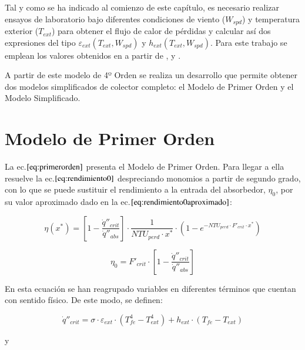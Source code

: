 Tal y como se ha indicado al comienzo de este capítulo, es necesario realizar ensayos de laboratorio bajo diferentes condiciones de viento (\(W_{spd}\)) y temperatura exterior (\(T_{ext}\)) para obtener el flujo de calor de pérdidas y calcular así dos expresiones del tipo \(\varepsilon_{ext}(T_{ext},W_{spd})\) y \(h_{ext}(T_{ext},W_{spd})\). Para este trabajo se emplean los valores obtenidos en \cite{barberofresnoDesarrolloModeloTeorico2018} a partir de \cite{burkholderHeatLossTesting2009}, \cite{burkholderHeatLossTestingSolel2008} y \cite{kutscherGenerationParabolicTrough2012}.

A partir de este modelo de 4º Orden se realiza un desarrollo que permite obtener dos modelos simplificados de colector completo: el Modelo de Primer Orden y el Modelo Simplificado.

\section{Modelo de Primer Orden}

La ec.\(\eqref{eq:primerorden}\) presenta el Modelo de Primer Orden. Para llegar a ella resuelve la ec.\(\eqref{eq:rendimiento0}\) despreciando monomios a partir de segundo grado, con lo que se puede sustituir el rendimiento a la entrada del absorbedor, \(\eta_{0}\), por su valor aproximado dado en la ec.\(\eqref{eq:rendimiento0aproximado}\):

\begin{equation}
    \eta(x^{*}) = \left[1-\frac{\dot q''_{crit}}{\dot q''_{abs}}\right] \cdot \frac{1}{NTU_{perd} \cdot x^{*}} \cdot \left(1-e^{-NTU_{perd}\cdot F'_{crit}\cdot x^{*}}\right) 
    \label{eq:primerorden}
\end{equation}

\begin{equation}
    \eta_{0} = F'_{crit} \cdot \left[1-\frac{\dot q''_{crit}}{\dot q''_{abs}}\right] 
    \label{eq:rendimiento0aproximado}
\end{equation}

En esta ecuación se han reagrupado variables en diferentes términos que cuentan con sentido físico. De este modo, se definen:

\begin{equation}
    \dot q''_{crit} = \sigma \cdot \varepsilon_{ext} \cdot \left(T^{4}_{fe}- T^{4}_{ext}\right)+h_{ext} \cdot \left(T_{fe}- T_{ext}\right)
    \label{eq:qcrit}
\end{equation}

y

